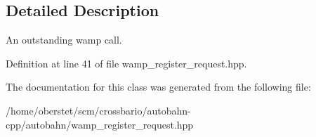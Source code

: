 \subsection{Detailed Description}
An outstanding wamp call. 

Definition at line 41 of file wamp\+\_\+register\+\_\+request.\+hpp.



The documentation for this class was generated from the following file\+:\begin{DoxyCompactItemize}
\item 
/home/oberstet/scm/crossbario/autobahn-\/cpp/autobahn/wamp\+\_\+register\+\_\+request.\+hpp\end{DoxyCompactItemize}
